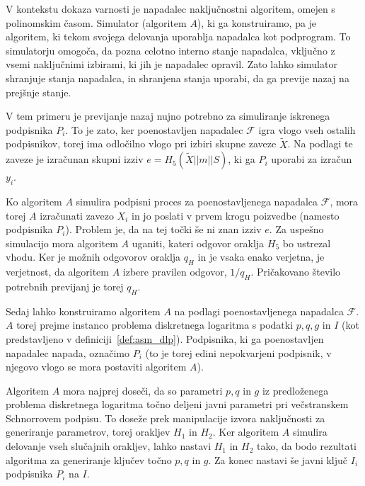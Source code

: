 \documentclass[isrm2, tisk]{fmfdelo}
\begin{document}
\begin{opomba}
    V kontekstu dokaza varnosti je napadalec naključnostni algoritem, omejen s polinomskim časom.
    Simulator (algoritem $A$), ki ga konstruiramo, pa je algoritem, ki tekom svojega delovanja
    uporablja napadalca kot podprogram. To simulatorju omogoča, da pozna celotno interno stanje
    napadalca, vključno z vsemi naključnimi izbirami, ki jih je napadalec opravil. Zato lahko
    simulator shranjuje stanja napadalca, in shranjena stanja uporabi, da ga previje nazaj na
    prejšnje stanje.
\end{opomba}

V tem primeru je previjanje nazaj nujno potrebno za simuliranje iskrenega podpisnika $P_i$. To je zato,
ker poenostavljen napadalec $\mathcal{F}$ igra vlogo vseh ostalih podpisnikov, torej ima odločilno
vlogo pri izbiri skupne zaveze $\tilde{X}$. Na podlagi te zaveze je izračunan skupni izziv 
$e = H_5(\tilde{X} || m || S)$, ki ga $P_i$ uporabi za izračun $y_i$. 

Ko algoritem $A$ simulira podpisni proces za poenostavljenega napadalca $\mathcal{F}$, mora torej
$A$ izračunati zavezo $X_i$ in jo poslati v prvem krogu poizvedbe (namesto podpisnika $P_i$). Problem
je, da na tej točki še ni znan izziv $e$. Za uspešno simulacijo mora algoritem $A$ uganiti, kateri
odgovor oraklja $H_5$ bo ustrezal vhodu. Ker je možnih odgovorov oraklja $q_H$ in je vsaka enako
verjetna, je verjetnost, da algoritem $A$ izbere pravilen odgovor, $1/q_H$. Pričakovano število
potrebnih previjanj je torej $q_H$.

Sedaj lahko konstruiramo algoritem $A$ na podlagi poenostavljenega napadalca $\mathcal{F}$. $A$ torej
prejme instanco problema diskretnega logaritma s podatki $p, q, g$ in $I$ (kot predstavljeno v 
definiciji~\ref{def:asm_dlp}). Podpisnika, ki ga poenostavljen napadalec napada, označimo $P_i$
(to je torej edini nepokvarjeni podpisnik, v njegovo vlogo se mora postaviti algoritem $A$).

Algoritem $A$ mora najprej doseči, da so parametri $p, q$ in $g$ iz predloženega problema diskretnega
logaritma točno deljeni javni parametri pri večstranskem Schnorrovem podpisu. To doseže prek
manipulacije izvora naključnosti za generiranje parametrov, torej orakljev $H_1$ in $H_2$. Ker
algoritem $A$ simulira delovanje vseh slučajnih orakljev, lahko nastavi $H_1$ in $H_2$ tako, da
bodo rezultati algoritma za generiranje ključev točno $p, q$ in $g$. Za konec nastavi še javni
ključ $I_i$ podpisnika $P_i$ na $I$.
\end{document}
